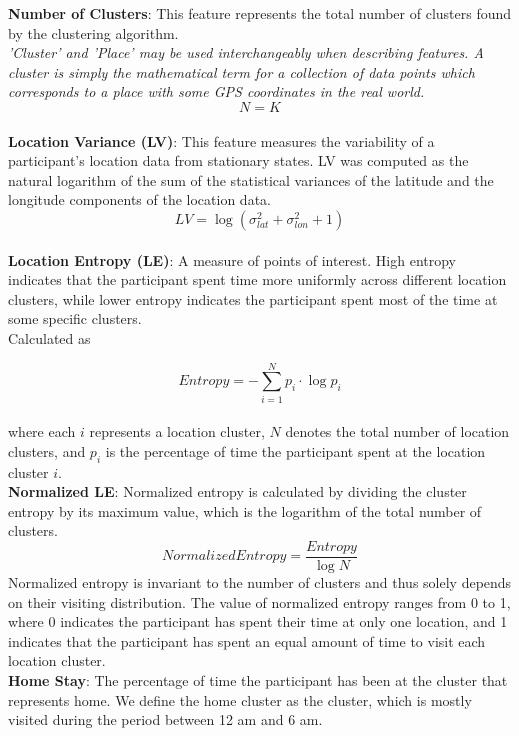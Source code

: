 \textbf{Number of Clusters}: This feature represents the total number of clusters found by the clustering algorithm.\\
\textit{'Cluster' and 'Place' may be used interchangeably when describing features. A cluster is simply the mathematical term for a collection of data points which corresponds to a place with some GPS coordinates in the real world.}\\

$$N = K$$\\

\textbf{Location Variance (LV)}: This feature measures the variability of a participant’s location data from stationary states. LV was computed as the natural logarithm of the sum of the statistical variances of the latitude and the longitude components of the location data.\\

$$LV = \log (\sigma^2_{lat} + \sigma^2_{lon} + 1) $$\\

\textbf{Location Entropy (LE)}: A measure of points of interest. High
entropy indicates that the participant spent time more uniformly across different location
clusters, while lower entropy indicates the participant spent most of the time at some
specific clusters.\\
Calculated as 

$$Entropy = - \sum_{i=1}^N p_i \cdot \log p_i$$\\

where each $i$ represents a location cluster, $N$ denotes the total number of location clusters, and $p_i$ is the percentage of time the participant spent at the location cluster $i$. \\

\textbf{Normalized LE}: Normalized entropy is calculated by dividing the cluster entropy by its maximum value, which is the logarithm of the total number of clusters. 
$$Normalized Entropy = \frac{Entropy}{\log N}$$
Normalized entropy is invariant to the number of clusters and thus solely depends on their visiting distribution. The value of normalized entropy ranges from 0 to 1, where 0 indicates the participant has spent their time at only one location, and 1 indicates that the participant has spent an equal amount of time to visit each location cluster.\\

\textbf{Home Stay}: The percentage of time the participant has been at the cluster that represents home. We define the home cluster as the cluster, which is mostly visited during the period between 12 am and 6 am.\\

